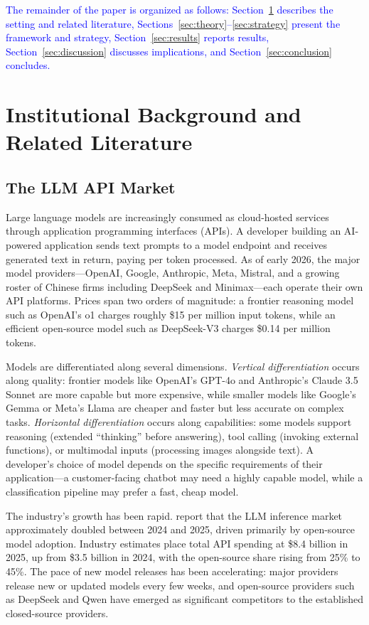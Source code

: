 \documentclass[11pt, a4paper]{article}
\begin{document}
\textcolor{blue}{The remainder of the paper is organized as follows: Section~\ref{sec:background} describes the setting and related literature, Sections~\ref{sec:theory}--\ref{sec:strategy} present the framework and strategy, Section~\ref{sec:results} reports results, Section~\ref{sec:discussion} discusses implications, and Section~\ref{sec:conclusion} concludes.}

\section{Institutional Background and Related Literature}
\label{sec:background}

\subsection{The LLM API Market}

Large language models are increasingly consumed as cloud-hosted services through application programming interfaces (APIs). A developer building an AI-powered application sends text prompts to a model endpoint and receives generated text in return, paying per token processed. As of early 2026, the major model providers---OpenAI, Google, Anthropic, Meta, Mistral, and a growing roster of Chinese firms including DeepSeek and Minimax---each operate their own API platforms. Prices span two orders of magnitude: a frontier reasoning model such as OpenAI's o1 charges roughly \$15 per million input tokens, while an efficient open-source model such as DeepSeek-V3 charges \$0.14 per million tokens.

Models are differentiated along several dimensions. \emph{Vertical differentiation} occurs along quality: frontier models like OpenAI's GPT-4o and Anthropic's Claude 3.5 Sonnet are more capable but more expensive, while smaller models like Google's Gemma or Meta's Llama are cheaper and faster but less accurate on complex tasks. \emph{Horizontal differentiation} occurs along capabilities: some models support reasoning (extended ``thinking'' before answering), tool calling (invoking external functions), or multimodal inputs (processing images alongside text). A developer's choice of model depends on the specific requirements of their application---a customer-facing chatbot may need a highly capable model, while a classification pipeline may prefer a fast, cheap model.

The industry's growth has been rapid. \citet{demirer2025emerging} report that the LLM inference market approximately doubled between 2024 and 2025, driven primarily by open-source model adoption. Industry estimates place total API spending at \$8.4 billion in 2025, up from \$3.5 billion in 2024, with the open-source share rising from 25\% to 45\%. The pace of new model releases has been accelerating: major providers release new or updated models every few weeks, and open-source providers such as DeepSeek and Qwen have emerged as significant competitors to the established closed-source providers.
\end{document}
